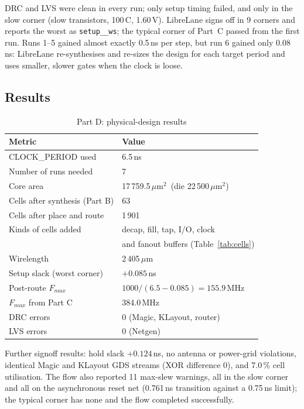 \documentclass[conference]{IEEEtran}
\newcommand{\um}{\,$\mu$m}
\newcommand{\umsq}{\,$\mu$m$^2$}
\newcommand{\cell}[1]{\texttt{\detokenize{#1}}}
\begin{document}
DRC and LVS were clean in every run; only setup timing failed, and only in the slow corner
\cell{max_ss_100C_1v60} (slow transistors, 100\,\textdegree C, 1.60\,V). LibreLane signs off in 9 corners and
reports the worst as \texttt{setup\_\_ws}; the typical corner of Part~C passed from the first run. Runs 1--5
gained almost exactly 0.5\,ns per step, but run 6 gained only 0.08\,ns: LibreLane re-synthesises and re-sizes
the design for each target period and uses smaller, slower gates when the clock is loose.

\subsection{Results}
\begin{table}[H]
\centering
\caption{Part D: physical-design results}
\label{tab:pnr}
\begin{tabular}{ll}
\toprule
\textbf{Metric} & \textbf{Value} \\
\midrule
CLOCK\_PERIOD used & 6.5\,ns \\
Number of runs needed & 7 \\
Core area & 17\,759.5\umsq\ (die 22\,500\umsq) \\
Cells after synthesis (Part B) & 63 \\
Cells after place and route & 1\,901 \\
Kinds of cells added & decap, fill, tap, I/O, clock \\
 & and fanout buffers (Table~\ref{tab:cells}) \\
Wirelength & 2\,405\um \\
Setup slack (worst corner) & $+0.085$\,ns \\
Post-route $F_{max}$ & $1000/(6.5-0.085) = 155.9$\,MHz \\
$F_{max}$ from Part C & 384.0\,MHz \\
DRC errors & 0 (Magic, KLayout, router) \\
LVS errors & 0 (Netgen) \\
\bottomrule
\end{tabular}
\end{table}

Further signoff results: hold slack $+0.124$\,ns, no antenna or power-grid violations, identical Magic and
KLayout GDS streams (XOR difference 0), and 7.0\,\% cell utilisation. The flow also reported 11 max-slew
warnings, all in the slow corner and all on the asynchronous reset net (0.761\,ns transition against a
0.75\,ns limit); the typical corner has none and the flow completed successfully.
\end{document}

